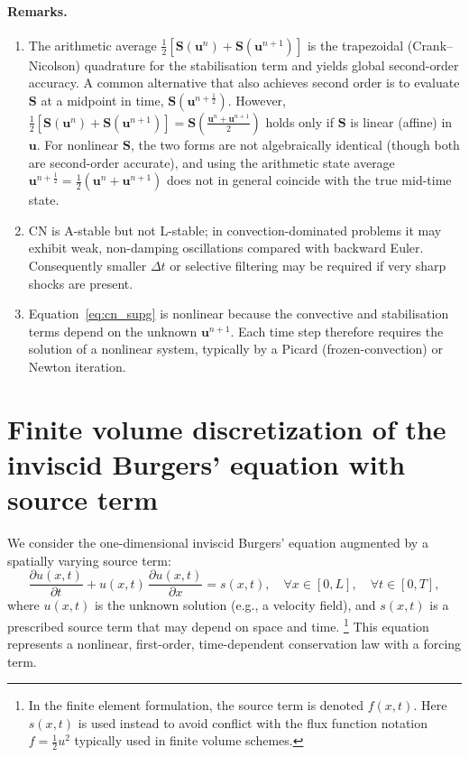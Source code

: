\paragraph{Remarks.}
\begin{enumerate}
  \item The arithmetic average 
        $\tfrac12\!\left[\mathbf S(\mathbf u^{n})+\mathbf S(\mathbf u^{n+1})\right]$
        is the trapezoidal (Crank–Nicolson) quadrature for the stabilisation term and
        yields global second-order accuracy.  A common alternative that also achieves
        second order is to evaluate $\mathbf S$ at a midpoint in time,
        $\mathbf S(\mathbf u^{n+\frac12})$.  However,
        $\tfrac12\!\left[\mathbf S(\mathbf u^{n})+\mathbf S(\mathbf u^{n+1})\right]
        = \mathbf S\!\left(\tfrac{\mathbf u^{n}+\mathbf u^{n+1}}{2}\right)$
        holds only if $\mathbf S$ is linear (affine) in $\mathbf u$.  For nonlinear
        $\mathbf S$, the two forms are not algebraically identical (though both are
        second-order accurate), and using the arithmetic state average
        $\mathbf u^{n+\frac12}=\tfrac12(\mathbf u^{n}+\mathbf u^{n+1})$ does not in
        general coincide with the true mid-time state.
  \item CN is A-stable but not L-stable; in convection-dominated problems it may
        exhibit weak, non-damping oscillations compared with backward Euler.
        Consequently smaller $\Delta t$ or selective filtering may be required if
        very sharp shocks are present.
  \item Equation~\eqref{eq:cn_supg} is nonlinear because the convective and
        stabilisation terms depend on the unknown $\mathbf u^{n+1}$.  Each time step
        therefore requires the solution of a nonlinear system, typically by a Picard
        (frozen-convection) or Newton iteration.
\end{enumerate}


\section{Finite volume discretization of the inviscid Burgers' equation with source term}
\label{appendix:fvm_burgers}
We consider the one-dimensional inviscid Burgers' equation augmented by a spatially varying source term:
\begin{equation}
\frac{\partial u(x,t)}{\partial t} + u(x,t)\,\frac{\partial u(x,t)}{\partial x} = s(x,t),
\quad \forall x \in [0, L],\quad \forall t \in [0, T],
\label{eq:burgers_strong}
\end{equation}
where \( u(x,t) \) is the unknown solution (e.g., a velocity field), and \( s(x,t) \) is a prescribed source term that may depend on space and time.%
\footnote{In the finite element formulation, the source term is denoted \( f(x,t) \). Here \( s(x,t) \) is used instead to avoid conflict with the flux function notation \( f = \frac{1}{2} u^2 \) typically used in finite volume schemes.}
This equation represents a nonlinear, first-order, time-dependent conservation law with a forcing term.


